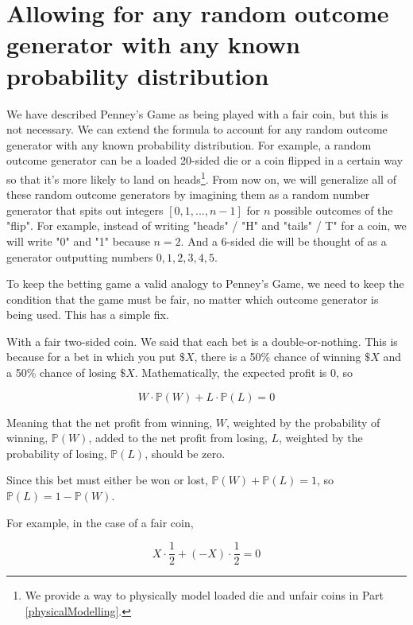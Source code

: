 \documentclass[english,12pt,a4paper,final]{article}
\begin{document}
\section{Allowing for any random outcome generator with any known probability distribution}

We have described Penney's Game as being played with a fair coin, but this is not necessary. We can extend the formula to account for any random outcome generator with any known probability distribution. For example, a random outcome generator can be a loaded 20-sided die or a coin flipped in a certain way so that it's more likely to land on heads\footnote{We provide a way to physically model loaded die and unfair coins in Part \ref{physicalModelling}.}. From now on, we will generalize all of these random outcome generators by imagining them as a random number generator that spits out integers $[0, 1, ..., n-1]$ for $n$ possible outcomes of the "flip". For example, instead of writing "heads" / "H" and "tails" / T" for a coin, we will write "0" and "1" because $n=2$. And a 6-sided die will be thought of as a generator outputting numbers $0, 1, 2, 3, 4, 5$.

To keep the betting game a valid analogy to Penney's Game, we need to keep the condition that the game must be fair, no matter which outcome generator is being used. This has a simple fix.

With a fair two-sided coin. We said that each bet is a double-or-nothing. This is because for a bet in which you put $\$X$, there is a 50\% chance of winning $\$X$ and a 50\% chance of losing $\$X$. Mathematically, the expected profit is 0, so

\begin{equation*}
	W \cdot \mathbb{P}(W) + L \cdot \mathbb{P}(L)=0
\end{equation*}

Meaning that the net profit from winning, $W$, weighted by the probability of winning, $\mathbb{P}(W)$, added to the net profit from losing, $L$, weighted by the probability of losing, $\mathbb{P}(L)$, should be zero.

Since this bet must either be won or lost, $\mathbb{P}(W) + \mathbb{P}(L) = 1$, so $\mathbb{P}(L) = 1-\mathbb{P}(W)$.

For example, in the case of a fair coin, 

\begin{equation*}
	X \cdot \frac{1}{2} + (-X) \cdot \frac{1}{2}=0
\end{equation*}
\end{document}
